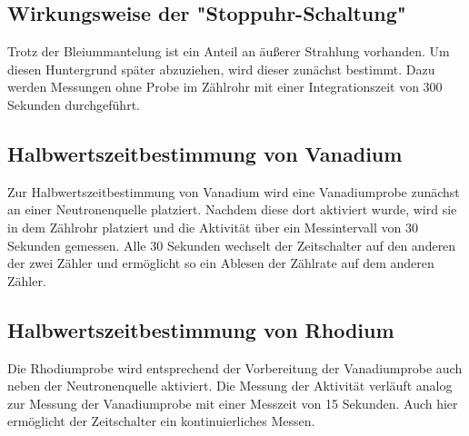     \subsection{Wirkungsweise der "Stoppuhr-Schaltung"}
        Trotz der Bleiummantelung ist ein Anteil an äußerer Strahlung vorhanden. Um diesen Huntergrund später abzuziehen, wird dieser zunächst bestimmt. Dazu werden Messungen ohne Probe im 
        Zählrohr mit einer Integrationszeit von 300 Sekunden durchgeführt.

    \subsection{Halbwertszeitbestimmung von Vanadium}
        Zur Halbwertszeitbestimmung von Vanadium wird eine Vanadiumprobe zunächst an einer Neutronenquelle platziert. Nachdem diese dort aktiviert wurde, wird sie in dem Zählrohr platziert und 
        die Aktivität über ein Messintervall von 30 Sekunden gemessen. Alle 30 Sekunden wechselt der Zeitschalter auf den anderen der zwei Zähler und ermöglicht so ein Ablesen der Zählrate auf
        dem anderen Zähler.

    \subsection{Halbwertszeitbestimmung von Rhodium}
        Die Rhodiumprobe wird entsprechend der Vorbereitung der Vanadiumprobe auch neben der Neutronenquelle aktiviert. Die Messung der Aktivität verläuft analog zur Messung der Vanadiumprobe
        mit einer Messzeit von 15 Sekunden. Auch hier ermöglicht der Zeitschalter ein kontinuierliches Messen.
        
